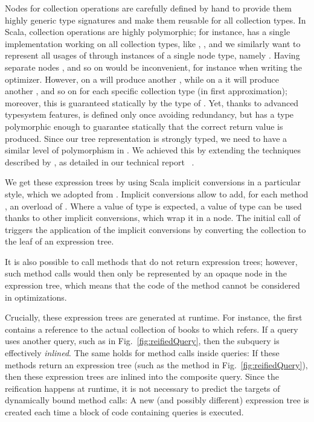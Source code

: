 Nodes for collection operations are carefully defined by hand to provide them
highly generic type signatures and make them reusable for all collection types.
In Scala, collection operations are highly polymorphic; for instance, 
has a single implementation working on all collection types, like ,
, and we similarly want to represent all usages of  through
instances of a single node type, namely . Having separate nodes ,  and so
on would be inconvenient, for instance when writing the optimizer.
However, 
on a  will produce another , while on a  it
will produce another , and so on for each specific collection type (in
first approximation); moreover, this is guaranteed statically by the type of
. Yet, thanks to advanced typesystem features,  is defined
only once avoiding redundancy, but has a type polymorphic enough to guarantee
statically that the correct return value is produced.
Since our tree representation is strongly typed, we need to have a similar level
of polymorphism in . We achieved this by extending the techniques
described by \citet{odersky2009fighting}, as detailed in our technical report%
~\citep{GiarrussoEtAl2012ReifyTR}.

We get these expression trees by using Scala implicit conversions in a particular style, which we adopted from
\citet{rompf2010lightweight}. Implicit conversions allow to add, for each method
, an overload of . Where a value of
type  is expected, a value of type  can be used thanks to
other implicit conversions, which wrap it in a  node. The initial call of  triggers the application of the implicit conversions by
converting the collection to the leaf of an expression tree.

It is also possible to call methods that do not return expression trees; however, such method calls would
then only be represented by an opaque  node in the expression tree, which means that the code
of the method cannot be considered in optimizations.

Crucially, these expression trees are generated at runtime. For instance,
the first  contains a reference to the actual collection of books to which  refers.
If a query uses another query, such as  in Fig.~\ref{fig:reifiedQuery}, then
the subquery is effectively \emph{inlined}. The same holds for method calls inside queries: If these methods
return an expression tree (such as the  method in Fig.~\ref{fig:reifiedQuery}), then
these expression trees are inlined into the composite query. Since the reification happens at runtime, it is not
necessary to predict the targets of dynamically bound method calls: A new (and possibly different) expression tree
is created each time a block of code containing queries is executed.

